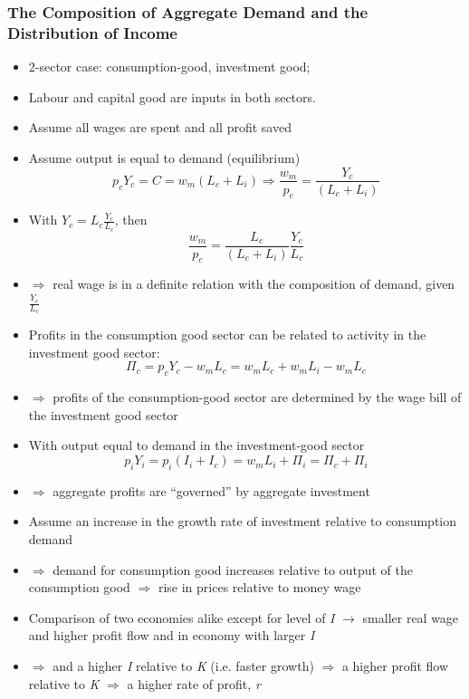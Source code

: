 \documentclass{article}
\begin{document}
\subsubsection{The Composition of Aggregate Demand and the Distribution of Income}
	\begin{itemize}
		\item 2-sector case: consumption-good, investment good;
		\item Labour and capital good are inputs in both sectors.
		\item Assume all wages are spent and all profit saved
		\item Assume output is equal to demand (equilibrium)
		\begin{equation}
			p_c Y_c = C = w_m \left( L_c + L_i \right) \Rightarrow \frac{w_m}{p_c} = \frac{Y_c}{\left( L_c + L_i \right)} \label{E:4.17}
		\end{equation}
		\item With \( Y_c = L_c \frac{Y_c}{L_c} \), then
		\begin{equation}
			\frac{w_m}{p_c} = \frac{L_c}{\left( L_c + L_i \right)}\frac{Y_c}{L_c} \label{E:4.18}
		\end{equation}
		\item \(\Rightarrow\) real wage is in a definite relation with the composition of demand, given \( \frac{Y_c}{L_c} \)
		\item  Profits in the consumption good sector can be related to activity in the investment good sector: 
		\begin{equation}
			\Pi_c = p_c Y_c - w_m L_c = w_m L_c + w_m L_i - w_m L_c \label{E:4.19}
		\end{equation}
		\item \( \Rightarrow \) profits of the consumption-good sector are determined by the wage bill of the investment good sector
		\item With output equal to demand in the investment-good sector
		\begin{equation}
			p_i Y_i = p_i \left( I_i + I_c \right) = w_m L_i + \Pi_i = \Pi_c + \Pi_i \label{E:4.20}
		\end{equation}
		\item \( \Rightarrow \) aggregate profits are ``governed'' by aggregate investment 
		\item Assume an increase in the growth rate of investment relative to consumption demand
		\item \( \Rightarrow \) demand for consumption good increases relative to output of the consumption good \( \Rightarrow \) rise in prices relative to money wage
		\item Comparison of two economies alike except for level of \textit{I} \( \rightarrow \) smaller real wage and higher profit flow and in economy with larger \textit{I}
		\item \textcolor{myred}{\( \Rightarrow \) and a higher \textit{I} relative to \textit{K} (i.e. faster growth) \( \Rightarrow \) a higher profit flow relative to \textit{K} \( \Rightarrow \) a higher rate of profit, \textit{r}}
	\end{itemize}
\end{document}

